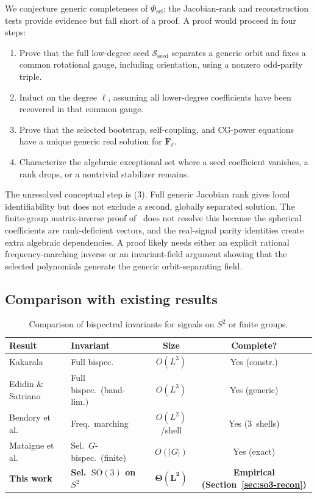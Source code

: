 \documentclass{article}
\theoremstyle{definition}
\theoremstyle{remark}
\newcommand{\SO}{\mathrm{SO}}
\theoremstyle{definition}
\begin{document}
We conjecture generic completeness of $\Phi_{\mathrm{sel}}$; the
Jacobian-rank and reconstruction tests provide evidence but fall short
of a proof. A proof would proceed in four steps:
\begin{enumerate}[leftmargin=*]
  \item Prove that the full low-degree seed
    $\mathcal{S}_{\mathrm{seed}}$ separates a generic orbit and fixes
    a common rotational gauge, including orientation, using a nonzero
    odd-parity triple.
  \item Induct on the degree $\ell$, assuming all lower-degree
    coefficients have been recovered in that common gauge.
  \item Prove that the selected bootstrap, self-coupling, and CG-power
    equations have a unique generic real solution for
    $\mathbf{F}_\ell$.
  \item Characterize the algebraic exceptional set where a seed
    coefficient vanishes, a rank drops, or a nontrivial stabilizer
    remains.
\end{enumerate}
The unresolved conceptual step is (3). Full generic Jacobian rank
gives local identifiability but does not exclude a second, globally
separated solution. The finite-group matrix-inverse proof
of~\citet{mataigne2024selective} does not resolve this because the
spherical coefficients are rank-deficient vectors, and the real-signal
parity identities create extra algebraic dependencies. A proof likely
needs either an explicit rational frequency-marching inverse or an
invariant-field argument showing that the selected polynomials
generate the generic orbit-separating field.

\subsection{Comparison with existing results}
\label{sec:app-comparison}

\begin{table}[h]
  \caption{Comparison of bispectral invariants for signals on $S^2$ or
    finite groups.}
  \label{tab:app-comparison}
  \centering
  \small
  \setlength{\tabcolsep}{4pt}
  \begin{tabular}{@{}l l c c@{}}
    \toprule
    Result & Invariant & Size & Complete? \\
    \midrule
    Kakarala~\citep{kakarala2012bispectrum}
      & Full bispec. & $O(L^3)$ & Yes (constr.) \\
    Edidin \& Satriano~\citep{edidin2024orbit}
      & Full bispec.\ (band-lim.)
      & $O(L^3)$ & Yes (generic) \\
    Bendory et al.~\citep{bendory2025orbit}
      & Freq.\ marching
      & $O(L^2)$/shell & Yes (3~shells) \\
    Mataigne et al.~\citep{mataigne2024selective}
      & Sel.\ $G$-bispec.\ (finite)
      & $O(|G|)$ & Yes (exact) \\
    \textbf{This work}
      & \textbf{Sel.\ $\SO(3)$ on $S^2$}
      & $\boldsymbol{\Theta(L^2)}$
      & \textbf{Empirical (Section~\ref{sec:so3-recon})} \\
    \bottomrule
  \end{tabular}
\end{table}
\end{document}
